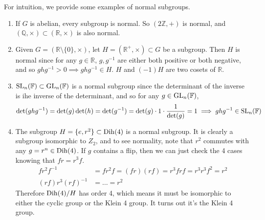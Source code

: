   \begin{example}
    For intuition, we provide some examples of normal subgroups. 
    \begin{enumerate}
      \item If $G$ is abelian, every subgroup is normal. So $(2\mathbb{Z}, +)$ is normal, and $(\mathbb{Q}, \times) \subset (\mathbb{R}, \times)$ is also normal. 
      \item Given $G = (\mathbb{R} \setminus \{0\}, \times)$, let $H = (\mathbb{R}^+, \times) \subset G$ be a subgroup. Then $H$ is normal since for any $g \in \mathbb{R}$, $g, g^{-1}$ are either both positive or both negative, and so $g h g^{-1} > 0 \implies g h g^{-1} \in H$. $H$ and $(-1)H$ are two cosets of $\mathbb{R}$. 
      \item $\SL_n (\mathbb{F}) \subset \GL_n (\mathbb{F})$ is a normal subgroup since the determinant of the inverse is ihe inverse of the determinant, and so for any $g \in \GL_n (\mathbb{F})$, 
      \begin{equation}
        \det(g h g^{-1}) = \det(g) \det(h) = \det(g^{-1}) = \det(g) \cdot 1 \cdot \frac{1}{\det(g)} = 1 \implies g h g^{-1} \in \SL_n (\mathbb{F}) 
      \end{equation}

      \item The subgroup $H = \{e, r^2\} \subset \Dih(4)$ is a normal subgroup. It is clearly a subgroup isomorphic to $Z_2$, and to see normality, note that $r^2$ commutes with any $g = r^n \in \Dih(4)$. If $g$ contains a flip, then we can just check the 4 cases knowing that $f r = r^3 f$. 
      \begin{align}
        f r^2 f^{-1} & = f r^2 f = (f r)(r f) = r^3 f r f = r^3 r^3 f^2 = r^2 \\ 
        (rf) r^3 (rf)^{-1} & = \ldots = r^2
      \end{align}
      Therefore $\Dih(4)/H$ has order 4, which means it must be isomorphic to either the cyclic group or the Klein 4 group. It turns out it's the Klein 4 group. 
    \end{enumerate}
  \end{example}

